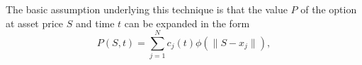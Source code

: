 \documentclass[12pt]{article}
\numberwithin{equation}{subsection} %
\newtheorem{mydef}{Definition}
\begin{document}
 The basic assumption underlying this technique is that the value $P$  of the option at asset price $S$ and time
$t$ can be expanded in the form
\begin{equation}\label{rbf1}
P (S,t) = \sum_{j=1}^N c_j(t) \phi(\|S-x_j\|),
\end{equation}

\end{document}
